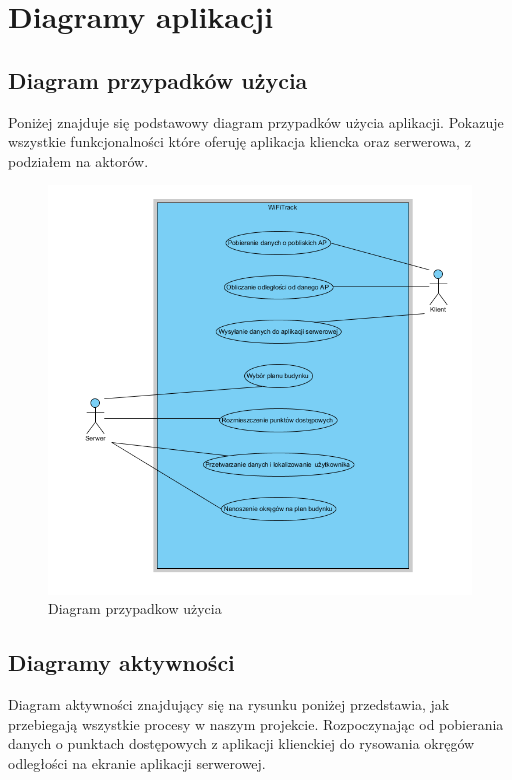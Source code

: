 \documentclass{article}
\begin{document}
\newpage

\section{Diagramy aplikacji}
\subsection{Diagram przypadków użycia}
Poniżej znajduje się podstawowy diagram przypadków użycia aplikacji. Pokazuje wszystkie funkcjonalności które oferuję aplikacja kliencka oraz serwerowa, z podziałem na aktorów.


\begin{figure}[H]
	\centering
	\includegraphics[width=15cm]{przypadkiuzycia.png}
	\caption{Diagram przypadkow użycia}
	\label{fig:przypadkiuzycia.png}
\end{figure}
\newpage
\subsection{Diagramy aktywności}
Diagram aktywności znajdujący się na rysunku poniżej przedstawia, jak przebiegają wszystkie procesy w naszym projekcie. Rozpoczynając od pobierania danych o punktach dostępowych z aplikacji klienckiej do rysowania okręgów odległości na ekranie aplikacji serwerowej.
\end{document}
